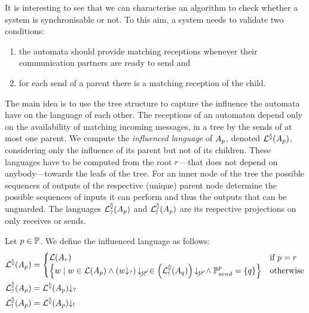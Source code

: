 \documentclass[submission,copyright,creativecommons,UKenglish]{eptcs}
\begin{document}
It is interesting to see that we can characterise an algorithm to check whether a system is synchronisable or not.
To this aim, a system needs to validate two conditions: 
\begin{enumerate}
	\item the automata should provide matching receptions whenever their communication partners are ready to send and
	\item for each send of a parent there is a matching reception of the child. 
\end{enumerate}
The main idea is to use the tree structure to capture the influence the automata have on the language of each other.
The receptions of an automaton depend only on the availability of matching incoming messages, \ie in a tree by the sends of at most one parent.
We compute the \emph{influenced language} of $ A_{p} $, denoted $ \mathcal{L}^{\between}{\left( A_{p} \right)} $, considering only the influence of its parent but not of its children.
These languages have to be computed from the root $ r $---that does not depend on anybody---towards the leafs of the tree.
For an inner node of the tree the possible sequences of outputs of the respective (unique) parent node determine the possible sequences of inputs it can perform and thus the outputs that can be unguarded.
The languages $ \mathcal{L}_{?}^{\between}{\left( A_{p} \right)} $ and $ \mathcal{L}_{!}^{\between}{\left( A_{p} \right)} $ are its respective projections on only receives or sends.

\begin{definition}
	Let $p \in \mathbb{P}$.
	We define the influenced language as follows:
	\begin{align*}
		\mathcal{L}^{\between}{\left( A_{p} \right)} &=
			\begin{cases}
				\mathcal{L}{\left(A_{r}\right)} & \text{if } p = r\\
				{\left\lbrace w \mid w \in \mathcal{L}{\left(A_{p}\right)} \wedge \left( w{\downarrow_{?}} \right){\downarrow_{\cancel{!?}}} \in \left( \mathcal{L}_{!}^{\between}{\left( A_{q} \right)} \right){\downarrow_{\cancel{!?}}} \wedge \mathbb{P}_{send}^{p} = {\left\lbrace q \right\rbrace}  \right\rbrace} & \text{otherwise}
			\end{cases}\\
		\mathcal{L}_{?}^{\between}{\left( A_{p} \right)} &= \mathcal{L}^{\between}{\left( A_{p} \right)}{\downarrow_{?}}\\
		\mathcal{L}_{!}^{\between}{\left( A_{p} \right)} &= \mathcal{L}^{\between}{\left( A_{p} \right)}{\downarrow_{!}}
	\end{align*}
\end{definition}
\end{document}
